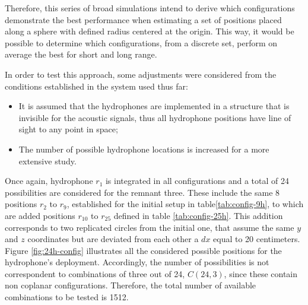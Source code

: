 Therefore, this series of broad simulations intend to derive which configurations demonstrate the best performance when estimating a set of positions placed along a sphere with defined radius centered at the origin. This way, it would be possible to determine which configurations, from a discrete set, perform on average the best for short and long range.

In order to test this approach, some adjustments were considered from the conditions established in the system used thus far:
\begin{itemize}
	\item It is assumed that the hydrophones are implemented in a structure that is invisible for the acoustic signals, thus all hydrophone positions have line of sight to any point in space;
	\item  The number of possible hydrophone locations is increased for a more extensive study.
\end{itemize}

Once again, hydrophone $r_1$ is integrated in all configurations and a total of 24 possibilities are considered for the remnant three. These include the same 8 positions $r_2$ to $r_9$, established for the initial setup in table\ref{tab:config-9h}, to which are added positions $r_{10}$ to $r_{25}$ defined in table \ref{tab:config-25h}. This addition corresponds to two replicated circles from the initial one, that assume the same $y$ and $z$ coordinates but are deviated from each other a $dx$ equal to 20 centimeters. Figure \ref{fig:24h-config} illustrates all the considered possible positions for the hydrophone's deployment. Accordingly, the number of possibilities is not correspondent to combinations of three out of 24, $C(24,3)$, since these contain non coplanar configurations. Therefore, the total number of available combinations to be tested is 1512.

\begin{table}[!htbp] %
	\begin{center}
		\caption{Additional coordinates for an implementation with 25 hydrophones}
		\label{tab:config-25h}
	\end{center}
\end{table}

